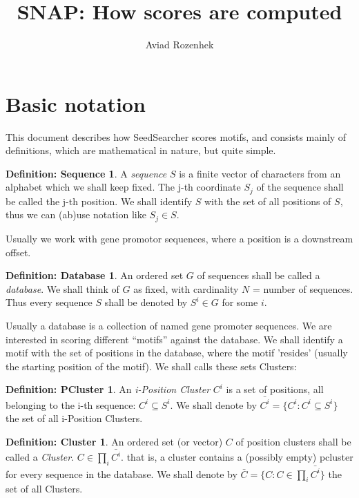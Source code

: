 \documentclass{amsart}
\author{Aviad Rozenhek}
\title{SNAP: How scores are computed}
\theoremstyle{definition}
\newtheorem*{sequence}{Definition: Sequence}
\newtheorem*{database}{Definition: Database}
\newtheorem*{pcluster}{Definition: PCluster}
\newtheorem*{cluster}{Definition: Cluster}
\theoremstyle{remark}
\theoremstyle{definition}
\theoremstyle{remark}
\begin{document}
\maketitle
\tableofcontents

\section{Basic notation}

This document describes how SeedSearcher scores motifs,
and consists mainly of definitions, which are mathematical in nature, but quite simple.

\begin{sequence} 
A \emph{sequence} $S$ is a finite vector of characters 
from an alphabet which we shall keep fixed.
The j-th coordinate $S_j$ of the sequence shall be called the j-th position. 
We shall identify $S$ with the set of all positions of $S$,
thus we can (ab)use notation like $S_j \in S$.
\end{sequence}

Usually we work with gene promotor sequences, where a position is a downstream offset.

\begin{database} 
An ordered set $G$ of sequences shall be called a \emph{database}. 
We shall think of $G$ as fixed, with cardinality $N$ = number of sequences.
Thus every sequence $S$ shall be denoted by $S^i \in G$ for some $i$.
\end{database}

Usually a database is a collection of named gene promoter sequences.
We are interested in scoring different ``motifs'' against the database.
We shall identify a motif with the set of positions
in the database, where the motif 'resides' (usually the starting position of the motif).
We shall calls these sets Clusters:

\begin{pcluster} 
An \emph{i-Position Cluster} $C^i$ is a set of positions, all belonging to the i-th sequence:
$C^i \subseteq S^i$. 
We shall denote by $\bar{C^i} = \{ C^i : C^i \subseteq S^i \}$ 
the set of all i-Position Clusters.
\end{pcluster}

\begin{cluster} 
An ordered set (or vector) $C$ of position clusters shall be called a \emph{Cluster}.
$C \in \prod_i \bar{C^i}$. that is, a cluster contains a (possibly empty)
pcluster for every sequence in the database.
We shall denote by $\bar{C} = \{ C : C \in \prod_i \bar{C^i} \}$ 
the set of all Clusters.
\end{cluster}
\end{document}
